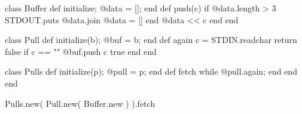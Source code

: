\documentclass{article}
\begin{document}
\begin{lnSnippet}
class Buffer
  def initialize; @data = []; end
  def push(c)
    if @data.length > 3
      STDOUT.puts @data.join
      @data = []
    end
    @data << c
  end
end

class Pull
  def initialize(b); @buf = b; end
  def again
    c = STDIN.readchar
    return false if c == "\n"
    @buf.push c
    true
  end
end

class Pulls
  def initialize(p); @pull = p; end
  def fetch
    while @pull.again; end
  end
end

Pulls.new(
  Pull.new(
    Buffer.new
  )
).fetch
\end{lnSnippet}




\end{document}
